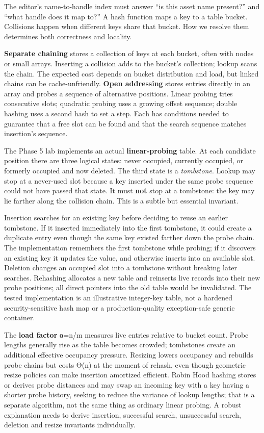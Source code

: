 The editor's name-to-handle index must answer ``is this asset name present?'' and ``what handle does it map to?'' A hash function maps a key to a table bucket. Collisions happen when different keys share that bucket. How we resolve them determines both correctness and locality.

\textbf{Separate chaining} stores a collection of keys at each bucket, often with nodes or small arrays. Inserting a collision adds to the bucket's collection; lookup scans the chain. The expected cost depends on bucket distribution and load, but linked chains can be cache-unfriendly. \textbf{Open addressing} stores entries directly in an array and probes a sequence of alternative positions. Linear probing tries consecutive slots; quadratic probing uses a growing offset sequence; double hashing uses a second hash to set a step. Each has conditions needed to guarantee that a free slot can be found and that the search sequence matches insertion's sequence.

The Phase 5 lab implements an actual \textbf{linear-probing} table. At each candidate position there are three logical states: never occupied, currently occupied, or formerly occupied and now deleted. The third state is a \emph{tombstone}. Lookup may stop at a never-used slot because a key inserted under the same probe sequence could not have passed that state. It must \textbf{not} stop at a tombstone: the key may lie farther along the collision chain. This is a subtle but essential invariant.

Insertion searches for an existing key before deciding to reuse an earlier tombstone. If it inserted immediately into the first tombstone, it could create a duplicate entry even though the same key existed farther down the probe chain. The implementation remembers the first tombstone while probing; if it discovers an existing key it updates the value, and otherwise inserts into an available slot. Deletion changes an occupied slot into a tombstone without breaking later searches. Rehashing allocates a new table and reinserts live records into their new probe positions; all direct pointers into the old table would be invalidated. The tested implementation is an illustrative integer-key table, not a hardened security-sensitive hash map or a production-quality exception-safe generic container.

The \textbf{load factor} α=n/m measures live entries relative to bucket count. Probe lengths generally rise as the table becomes crowded; tombstones create an additional effective occupancy pressure. Resizing lowers occupancy and rebuilds probe chains but costs Θ(n) at the moment of rehash, even though geometric resize policies can make insertion amortized efficient. Robin Hood hashing stores or derives probe distances and may swap an incoming key with a key having a shorter probe history, seeking to reduce the variance of lookup lengths; that is a separate algorithm, not the same thing as ordinary linear probing. A robust explanation needs to derive insertion, successful search, unsuccessful search, deletion and resize invariants individually.

